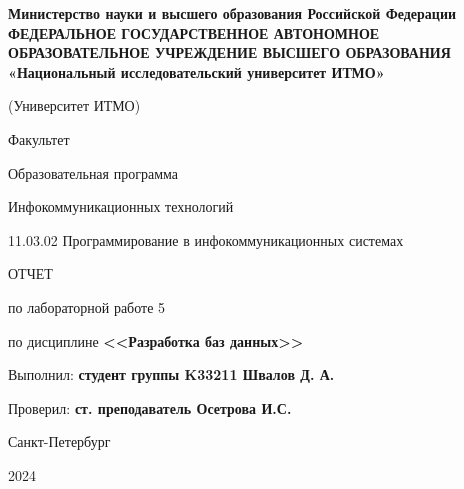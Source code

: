 \documentclass[a4paper, 14pt]{extarticle}
\begin{document}
\begin{titlepage}
  \vspace{0pt plus2fill}
  \noindent

  \vspace{0pt plus6fill}
  \begin{center}
    {
    \bfseries
    Министерство науки и высшего образования Российской Федерации
    {
    \scriptsize
    ФЕДЕРАЛЬНОЕ ГОСУДАРСТВЕННОЕ АВТОНОМНОЕ ОБРАЗОВАТЕЛЬНОЕ УЧРЕЖДЕНИЕ ВЫСШЕГО
    ОБРАЗОВАНИЯ
    }
    «Национальный исследовательский университет ИТМО»

    (Университет ИТМО)

    \begin{minipage}[t]{0.42\textwidth}
      \vspace*{0pt}
      \begin{flushright}
        Факультет

        Образовательная программа
      \end{flushright}
    \end{minipage}
    \begin{minipage}[t]{0.57\textwidth}
      \vspace*{0pt}
      \begin{flushright}
        Инфокоммуникационных технологий

        11.03.02 Программирование в инфокоммуникационных системах
      \end{flushright}
    \end{minipage}
    }

    \vspace{0pt plus5fill}

    \LARGE{
      ОТЧЕТ

      по лабораторной работе 5

      по дисциплине \textbf{<<Разработка баз данных>>}
    }
  \end{center}

  \vspace{0pt plus4fill}
  \begin{flushright}
    Выполнил: \textbf{студент группы K33211 Швалов Д. А.}

    Проверил: \textbf{ст. преподаватель Осетрова И.С.}
  \end{flushright}

  \vspace{0pt plus8fill}
  \begin{center}
    Санкт-Петербург

    2024
  \end{center}
\end{titlepage}
\end{document}
